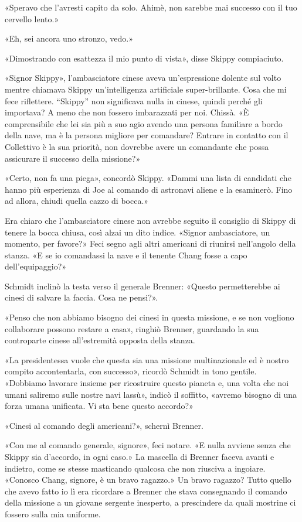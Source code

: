 «Speravo che l'avresti capito da solo. Ahimè, non sarebbe mai successo
con il tuo cervello lento.»

«Eh, sei ancora uno stronzo, vedo.»

«Dimostrando con esattezza il mio punto di vista», disse Skippy
compiaciuto.

«Signor Skippy», l'ambasciatore cinese aveva un'espressione dolente sul
volto mentre chiamava Skippy un'intelligenza artificiale
super-brillante. Cosa che mi fece riflettere. ``Skippy'' non significava
nulla in cinese, quindi perché gli importava? A meno che non fossero
imbarazzati per noi. Chissà. «È comprensibile che lei sia più a suo agio
avendo una persona familiare a bordo della nave, ma è la persona
migliore per comandare? Entrare in contatto con il Collettivo è la sua
priorità, non dovrebbe avere un comandante che possa assicurare il
successo della missione?»

«Certo, non fa una piega», concordò Skippy. «Dammi una lista di
candidati che hanno più esperienza di Joe al comando di astronavi aliene
e la esaminerò. Fino ad allora, chiudi quella cazzo di bocca.»

Era chiaro che l'ambasciatore cinese non avrebbe seguito il consiglio di
Skippy di tenere la bocca chiusa, così alzai un dito indice. «Signor
ambasciatore, un momento, per favore?» Feci segno agli altri americani
di riunirsi nell'angolo della stanza. «E se io comandassi la nave e il
tenente Chang fosse a capo dell'equipaggio?»

Schmidt inclinò la testa verso il generale Brenner: «Questo
permetterebbe ai cinesi di salvare la faccia. Cosa ne pensi?».

«Penso che non abbiamo bisogno dei cinesi in questa missione, e se non
vogliono collaborare possono restare a casa», ringhiò Brenner, guardando
la sua controparte cinese all'estremità opposta della stanza.

«La presidentessa vuole che questa sia una missione multinazionale ed è
nostro compito accontentarla, con successo», ricordò Schmidt in tono
gentile. «Dobbiamo lavorare insieme per ricostruire questo pianeta e,
una volta che noi umani saliremo sulle nostre navi lassù», indicò il
soffitto, «avremo bisogno di una forza umana unificata. Vi sta bene
questo accordo?»

«Cinesi al comando degli americani?», schernì Brenner.

«Con me al comando generale, signore», feci notare. «E nulla avviene
senza che Skippy sia d'accordo, in ogni caso.» La mascella di Brenner
faceva avanti e indietro, come se stesse masticando qualcosa che non
riusciva a ingoiare. «Conosco Chang, signore, è un bravo ragazzo.» Un
bravo ragazzo? Tutto quello che avevo fatto io lì era ricordare a
Brenner che stava consegnando il comando della missione a un giovane
sergente inesperto, a prescindere da quali mostrine ci fossero sulla mia
uniforme.

